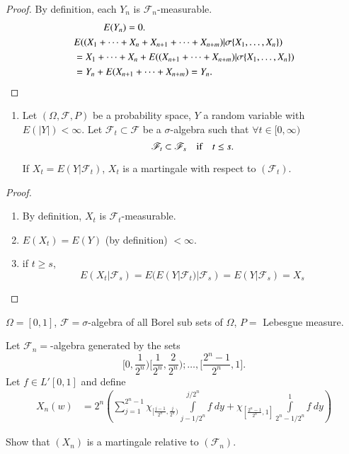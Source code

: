 \begin{proof}
By definition, each $Y_{n}$ is $\mathscr{F}_{n}$-measurable.
\begin{align*}
&\qquad\quad E(Y_{n})=0.\\
&
  E((X_{1}+\cdots+X_{n}+X_{n+1}+\cdots+X_{n+m})|\sigma\{X_{1},\ldots,X_{n}\})\\ 
&
  =X_{1}+\cdots+X_{n}+E((X_{n+1}+\cdots+X_{n+m})|\sigma\{X_{1},\ldots,X_{n}\})\\
&= Y_{n}+E(X_{n+1}+\cdots+X_{n+m})=Y_{n}.
\end{align*}
\end{proof}

\begin{enumerate}
\renewcommand{\labelenumi}{(\theenumi)}
\setcounter{enumi}{1}
\item Let $(\Omega,\mathscr{F},P)$ be a probability space, $Y$ a
  random variable with $E(|Y|)<\infty$. Let $\mathscr{F}_{t}\subset
  \mathscr{F}$ be a $\sigma$-algebra such that $\forall t\in
          [0,\infty)$
$$
\mathscr{F}_{t}\subset \mathscr{F}_{s}\quad\text{if}\quad t\leq s.
$$

If $X_{t}=E(Y|\mathscr{F}_{t})$, $X_{t}$ is a martingale with respect
to $(\mathscr{F}_{t})$.
\end{enumerate}

\begin{proof}
\begin{enumerate}
\renewcommand{\theenumi}{\roman{enumi}}
\renewcommand{\labelenumi}{(\theenumi)}
\item By definition, $X_{t}$ is $\mathscr{F}_{t}$-measurable.

\item $E(X_{t})=E(Y)$ (by definition) $<\infty$.

\item if $t\geq s$,
$$
E(X_{t}|\mathscr{F}_{s})=E(E(Y|\mathscr{F}_{t})|\mathscr{F}_{s})=E(Y|\mathscr{F}_{s})=X_{s} 
$$
\end{enumerate}
\end{proof}

\setcounter{exercise}{0}
\begin{exercise}
$\Omega=[0,1]$, $\mathscr{F}=\sigma$-algebra of all Borel sub sets of
  $\Omega$, $P=$ Lebesgue measure.

Let $\mathscr{F}_{n}=$-algebra generated by the sets
$$
\Big[0,\dfrac{1}{2^{n}}\Big)\Big[\dfrac{1}{2^{n}},\dfrac{2}{2^{n}}\Big);\ldots,\Big[\dfrac{2^{n}-1}{2^{n}},1\Big].
$$\pageoriginale
Let $f\in L'[0,1]$ and define
\begin{align*}
X_{n}(w) &=
2^{n}\left(\sum\limits^{2^{n}-1}_{j=1}\chi_{[\frac{j-1}{2^{n}},\frac{j}{2^{n}})}\int\limits^{j/2^{n}}_{j-1/2^{n}}f\ dy
  +\chi_{[\frac{2^{n}-1}{2^{n}},1]}\int\limits^{1}_{2^{n}-1/2^{n}}f\ dy\right) 
\end{align*}

Show that $(X_{n})$ is a martingale relative to $(\mathscr{F}_{n})$.
\end{exercise}

